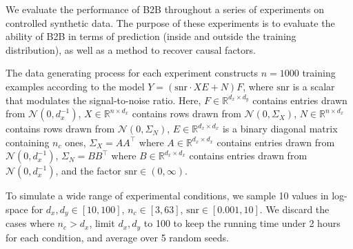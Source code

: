 We evaluate the performance of B2B throughout a series of experiments on
controlled synthetic data.
%
The purpose of these experiments is to evaluate the ability of B2B in terms of
prediction (inside and outside the training distribution), as well as a method
to recover causal factors.

The data generating process for each experiment constructs $n=1000$ training examples
according to the model $Y = (\text{snr} \cdot XE + N)F$, where $\text{snr}$ is a
scalar that modulates the signal-to-noise ratio.
%
Here,
    $F \in \mathbb{R}^{d_x \times d_y}$ contains entries drawn from
$\mathcal{N}(0, d_x^{-1})$, $X \in \mathbb{R}^{n \times d_x}$ contains rows
drawn from $\mathcal{N}(0, \Sigma_X)$, $N \in \mathbb{R}^{n \times d_x}$
contains rows drawn from $\mathcal{N}(0, \Sigma_N)$, $E \in \mathbb{R}^{d_x
\times d_x}$ is a binary diagonal matrix containing $n_c$ ones, $\Sigma_X =
AA^\top$ where $A \in \mathbb{R}^{d_x \times d_x}$ contains entries drawn from
$\mathcal{N}(0, d_x^{-1})$, $\Sigma_N = BB^\top$ where $B \in \mathbb{R}^{d_x
\times d_x}$ contains entries drawn from $\mathcal{N}(0, d_x^{-1})$, and the
factor $\text{snr} \in (0, \infty)$.

To simulate a wide range of experimental conditions, we sample 10 values in log-space for $d_x, d_y \in \left[ 10, 100 \right]$, $n_c \in \left[ 3, 63 \right]$,
$\text{snr} \in \left[ 0.001, 10 \right]$. We discard the cases where $n_c > d_x$, limit $d_x, d_y$ to 100 to keep the running time under 2 hours for each condition, and average over 5 random seeds.
%

